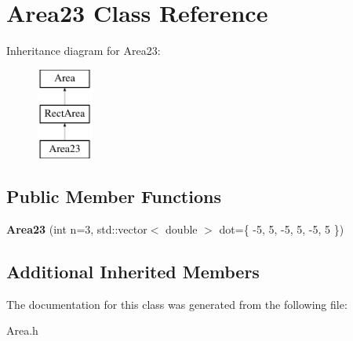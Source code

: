 \hypertarget{class_area23}{}\section{Area23 Class Reference}
\label{class_area23}
Inheritance diagram for Area23\+:\begin{figure}[H]
\begin{center}
\leavevmode
\includegraphics[height=3.000000cm]{class_area23}
\end{center}
\end{figure}
\subsection*{Public Member Functions}
\begin{DoxyCompactItemize}
\item 
\mbox{\label{class_area23_aaa474bc086be4c43ef022ddcae50cda1}} 
{\bfseries Area23} (int n=3, std\+::vector$<$ double $>$ dot=\{ -\/5, 5, -\/5, 5, -\/5, 5 \})
\end{DoxyCompactItemize}
\subsection*{Additional Inherited Members}


The documentation for this class was generated from the following file\+:\begin{DoxyCompactItemize}
\item 
Area.\+h\end{DoxyCompactItemize}
